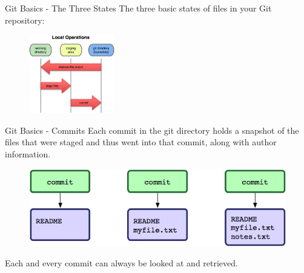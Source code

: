 \documentclass{beamer}
\def \figureHeight {130px}
\begin{document}
\begin{frame}{Git Basics - The Three States}
	The three basic states of files in your Git repository:
	\begin{figure}
		\includegraphics[height=\figureHeight]{images/the-three-states.png}
	\end{figure}
\end{frame}

\begin{frame}{Git Basics - Commits}
	Each commit in the git directory holds a snapshot of the files that were staged and thus went into that commit, along with author information.
	\begin{figure}
		\includegraphics[]{images/commit-repository-data.png}
	\end{figure}
	Each and every commit can always be looked at and retrieved.
\end{frame}
\end{document}
